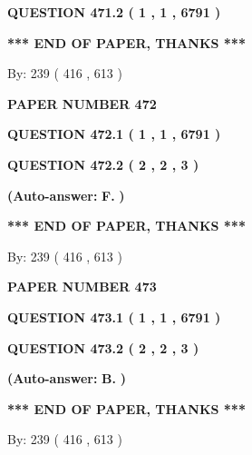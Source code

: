 \documentclass[12pt]{article}
\begin{document}
 
  
  
{\textbf{\large{QUESTION
471.2 
 ( 1 , 1 , 6791 )
}}}
   
   
   
   
\vspace{1.0in} 
{\textbf{\large{ *** END OF PAPER, THANKS *** }}} 
   
   
\hspace{1.0in} By: 
 239 ( 416 ,  613 )
   
   
   
   
\newpage 
\setcounter{page}{ 
   472001 } 
   
   
 {\textbf{ \Large{ PAPER NUMBER  472  }}}
   
   
   
   
  
  
{\textbf{\large{QUESTION
472.1 
 ( 1 , 1 , 6791 )
}}}
  
  
{\textbf{\large{QUESTION
472.2 
 ( 2 , 2 , 3 )
}}}
 
 
{\textbf{(Auto-answer:}}
{\textbf{\large{
F.}}}
{\textbf{)}}
 
 
   
   
   
   
\vspace{1.0in} 
{\textbf{\large{ *** END OF PAPER, THANKS *** }}} 
   
   
\hspace{1.0in} By: 
 239 ( 416 ,  613 )
   
   
   
   
\newpage 
\setcounter{page}{ 
   473001 } 
   
   
 {\textbf{ \Large{ PAPER NUMBER  473  }}}
   
   
   
   
  
  
{\textbf{\large{QUESTION
473.1 
 ( 1 , 1 , 6791 )
}}}
  
  
{\textbf{\large{QUESTION
473.2 
 ( 2 , 2 , 3 )
}}}
 
 
{\textbf{(Auto-answer:}}
{\textbf{\large{
B.}}}
{\textbf{)}}
 
 
   
   
   
   
\vspace{1.0in} 
{\textbf{\large{ *** END OF PAPER, THANKS *** }}} 
   
   
\hspace{1.0in} By: 
 239 ( 416 ,  613 )
   
   
   
   
\newpage 
\setcounter{page}{ 
   474001 } 
   
\end{document}
